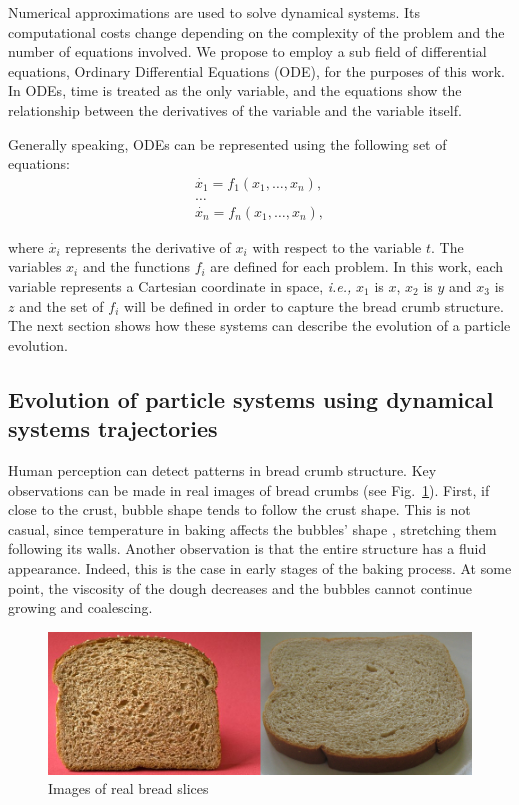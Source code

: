 \documentclass[oneside,a4paper,english,links]{amca}
\begin{document}
Numerical approximations are used to solve dynamical systems. Its computational costs change depending on the complexity of the problem and the number of equations involved. We propose to employ a sub field of differential equations, Ordinary Differential Equations (ODE), for the purposes of this work. In ODEs, time is treated as the only variable, and the equations show the relationship between the derivatives of the variable and the variable itself. 

Generally speaking, ODEs can be represented using the following set of equations:
\begin{equation} \label{eq:simple}  
  \begin{aligned}
    \dot{x_{1}} = f_{1}(x_{1},\ldots,x_{n}),\\
    \ldots\\
    \dot{x_{n}} = f_{n}(x_{1},\ldots,x_{n}),
  \end{aligned}
\end{equation}

\noindent where $\dot{x_{i}}$ represents the derivative of $x_{i}$ with respect
to the variable $t$. The variables $x_{i}$ and the functions $f_{i}$
are defined for each problem. In this work, each variable represents a
Cartesian coordinate in space, {\em i.e.,} $x_{1}$ is $x$, $x_{2}$ is
$y$ and $x_{3}$ is $z$ and the set of $f_{i}$ will be defined in order
to capture the bread crumb structure. The next section shows how these
systems can describe the evolution of a particle evolution.

\subsection{Evolution of particle systems using dynamical systems trajectories}

Human perception can detect patterns in bread crumb structure. Key
observations can be made in real images of bread crumbs (see
Fig.~\ref{fg:fig2}). First, if close to the crust, bubble shape tends
to follow the crust shape. This is not casual, since temperature in
baking affects the bubbles' shape \citep{Scanlon2001}, stretching
them following its walls. Another observation is that the entire
structure has a fluid appearance. Indeed, this is the case in
early stages of the baking process. At some point, the viscosity
of the dough decreases and the bubbles cannot continue growing and
coalescing.

\begin{figure}[htb!]
  \centerline{\includegraphics[scale=0.45]{fig2}}
  \caption{Images of real bread slices}
  \label{fg:fig2}
\end{figure}
\end{document}
